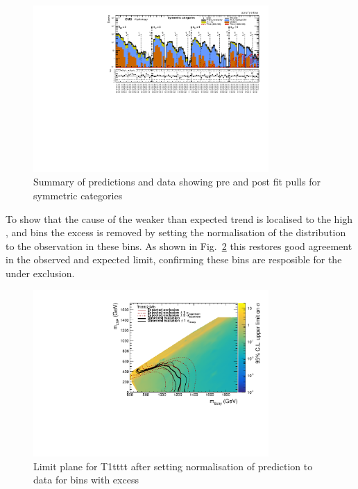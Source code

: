 \begin{figure}[tbhp]
  \caption{Summary of predictions and data showing pre and post fit pulls for symmetric categories\label{fig:T1ttttMountainRange}} 
  \begin{center}    
    \includegraphics[width=0.8\textwidth]{figures/susyResults/summaryPlot_Symmetric_prefit_overlay_fit_b}
  \end{center}
\end{figure}

To show that the cause of the weaker than expected trend is localised to the high 
\scalht, \njet and \nb bins the excess is removed by setting the normalisation
of the \mht distribution to the observation in these bins. As shown in 
Fig.~\ref{fig:removeExcessByHand} this restores good agreement in the 
observed and expected limit, confirming these bins are resposible for the under exclusion.

\begin{figure}[tbhp]
  \caption{Limit plane for T1tttt after setting normalisation of prediction to data for bins with excess \label{fig:removeExcessByHand}} 
  \begin{center}    
    \includegraphics[width=0.8\textwidth]{figures/susyResults/finalCanvasObsLimitXs_excessRemovedByHand}
  \end{center}
\end{figure}

